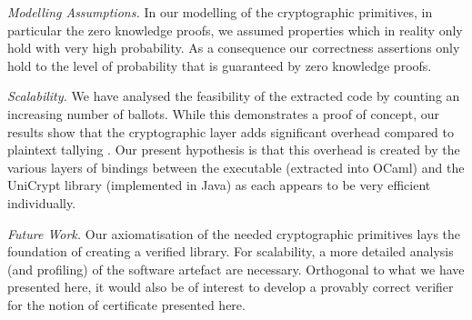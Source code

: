 \documentclass{llncs}
\begin{document}
\smallskip\noindent\emph{Modelling Assumptions.} In our modelling of
the cryptographic primitives, in particular the zero knowledge
proofs, we assumed properties which in reality only hold with
very high probability. As a
consequence our correctness assertions only hold to the level
of probability that is guaranteed by zero knowledge proofs.

\smallskip\noindent\emph{Scalability.} We have analysed the
feasibility of the extracted code by counting an increasing number
of ballots. While this demonstrates a proof of concept, our results
show that the cryptographic layer adds significant overhead compared
to plaintext tallying \cite{Pattinson:2017:SVE}.  Our present
hypothesis is that this overhead is created by the various layers of
bindings between the executable (extracted into OCaml) and the
UniCrypt library (implemented in Java) as each appears to be very
efficient individually. 

\smallskip\noindent\emph{Future Work.} Our axiomatisation of the
needed cryptographic primitives lays the foundation of creating a
verified library. For scalability, a more detailed analysis (and
profiling) of the software artefact are necessary. Orthogonal to
what we have presented here, it would also be of interest to develop
a provably correct verifier for the notion of certificate presented
here. 




%

%
%
\end{document}
